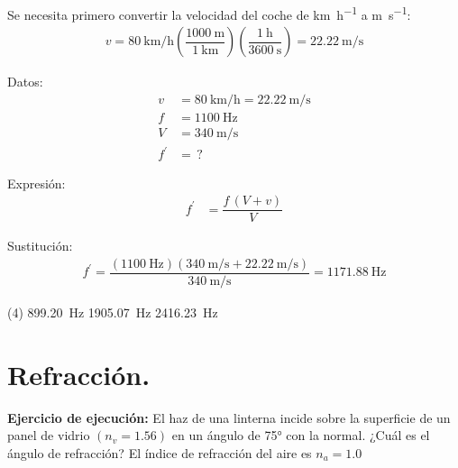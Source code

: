 \documentclass[12pt, letter]{exam}
\begin{document}
\begin{questions}
    Se necesita primero convertir la velocidad del coche de \unit{\kilo\meter\per\hour} a \unit{\meter\per\second}:
    \begin{align*}
    v = \SI[per-mode=fraction]{80}{\kilo\meter\per\hour} \left( \dfrac{\SI{1000}{\meter}}{\SI{1}{\kilo\meter}} \right) \left( \dfrac{\SI{1}{\hour}}{\SI{3600}{\second}} \right) = \SI[per-mode=fraction]{22.22}{\meter\per\second}
    \end{align*}
    
    \begin{minipage}[t]{0.35\linewidth}
    Datos: 
    \begin{align*}
    v &= \SI{80}{\kilo\meter\per\hour} = \SI{22.22}{\meter\per\second} \\
    f &= \SI{1100}{\hertz} \\
    V &= \SI{340}{\meter\per\second} \\
    f^{\prime} &= \, ?
    \end{align*}
    \end{minipage}
    \hspace{1cm}
    \begin{minipage}[t]{0.4\linewidth}
    Expresión:
    \begin{align*}
    f^{\prime} &= \dfrac{f \, (V + v)}{V}
    \end{align*}
    \end{minipage}

    Sustitución:
    \begin{align*}
    f^{\prime} = \dfrac{\left( \SI{1100}{\hertz} \right)\left( \displaystyle \SI[per-mode=fraction]{340}{\meter\per\second} + \SI[per-mode=fraction]{22.22}{\meter\per\second} \right)}{\displaystyle \SI[per-mode=fraction]{340}{\meter\per\second}} = \SI{1171.88}{\hertz}
    \end{align*}

    \begin{tasks}(4)
        \task \SI{899.20}{\hertz}
        \task {}
        \task \SI{1905.07}{\hertz}
        \task \SI{2416.23}{\hertz}
    \end{tasks}

    \setcounter{section}{5}

    \section{Refracción.}

    \setcounter{question}{14} \question \textbf{Ejercicio de ejecución: } El haz de una linterna incide sobre la superficie de un panel de vidrio $(n_{v} = 1.56)$ en un ángulo de \ang{75} con la normal. ¿Cuál es el ángulo de refracción? El índice de refracción del aire es $n_{a} = 1.0$
    

\end{questions}
\end{document}
